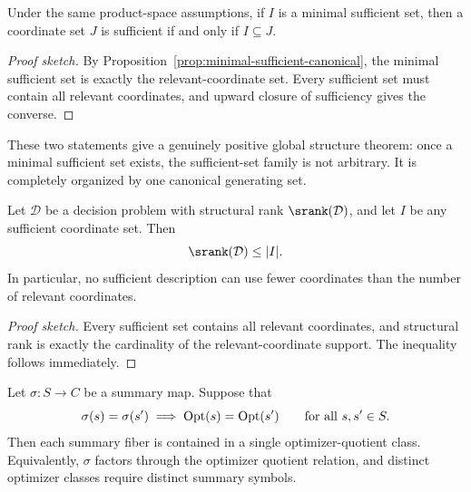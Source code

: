 \begin{corollary}\label{cor:sufficient-principal-filter}
Under the same product-space assumptions, if $I$ is a minimal sufficient set, then a coordinate set $J$ is sufficient if and only if $I \subseteq J$.
\end{corollary}

\begin{proof}[Proof sketch]
By Proposition~\ref{prop:minimal-sufficient-canonical}, the minimal sufficient set is exactly the relevant-coordinate set. Every sufficient set must contain all relevant coordinates, and upward closure of sufficiency gives the converse.
\end{proof}

These two statements give a genuinely positive global structure theorem: once a minimal sufficient set exists, the sufficient-set family is not arbitrary. It is completely organized by one canonical generating set.

\begin{corollary}\label{cor:srank-lower-bounds-sufficient}
Let $\mathcal{D}$ be a decision problem with structural rank $\srank(\mathcal{D})$, and let $I$ be any sufficient coordinate set. Then
\[
\srank(\mathcal{D}) \le |I|.
\]
In particular, no sufficient description can use fewer coordinates than the number of relevant coordinates.
\end{corollary}

\begin{proof}[Proof sketch]
Every sufficient set contains all relevant coordinates, and structural rank is exactly the cardinality of the relevant-coordinate support. The inequality follows immediately.
\end{proof}

\begin{proposition}\label{prop:zero-distortion-refines-quotient}
Let $\sigma : S \to C$ be a summary map. Suppose that
\[
\sigma(s)=\sigma(s') \implies \operatorname{Opt}(s)=\operatorname{Opt}(s')
\qquad\text{for all } s,s' \in S.
\]
Then each summary fiber is contained in a single optimizer-quotient class. Equivalently, $\sigma$ factors through the optimizer quotient relation, and distinct optimizer classes require distinct summary symbols.
\end{proposition}

